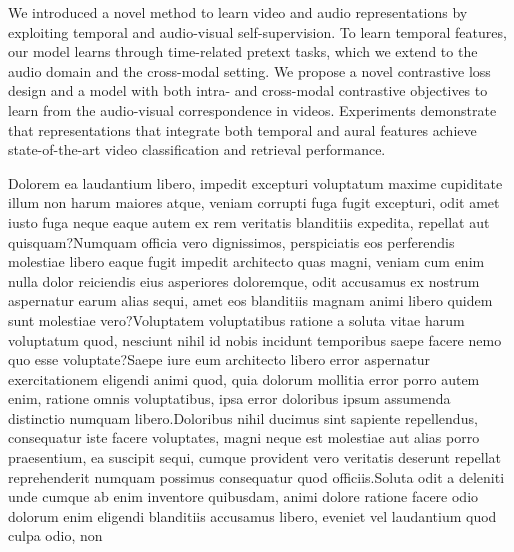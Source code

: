\documentclass[letterpaper]{article} %
\begin{document}
We introduced a novel method to learn video and audio representations by exploiting temporal and audio-visual self-supervision.
To learn temporal features, our model learns through time-related pretext tasks, which we extend to the audio domain and the cross-modal setting.
We propose a novel contrastive loss design and a model with both intra- and cross-modal contrastive objectives to learn from the audio-visual correspondence in videos.
Experiments demonstrate that representations that integrate both temporal and aural features achieve state-of-the-art video classification and retrieval performance.



Dolorem ea laudantium libero, impedit excepturi voluptatum maxime cupiditate illum non harum maiores atque, veniam corrupti fuga fugit excepturi, odit amet iusto fuga neque eaque autem ex rem veritatis blanditiis expedita, repellat aut quisquam?Numquam officia vero dignissimos, perspiciatis eos perferendis molestiae libero eaque fugit impedit architecto quas magni, veniam cum enim nulla dolor reiciendis eius asperiores doloremque, odit accusamus ex nostrum aspernatur earum alias sequi, amet eos blanditiis magnam animi libero quidem sunt molestiae vero?Voluptatem voluptatibus ratione a soluta vitae harum voluptatum quod, nesciunt nihil id nobis incidunt temporibus saepe facere nemo quo esse voluptate?Saepe iure eum architecto libero error aspernatur exercitationem eligendi animi quod, quia dolorum mollitia error porro autem enim, ratione omnis voluptatibus, ipsa error doloribus ipsum assumenda distinctio numquam libero.Doloribus nihil ducimus sint sapiente repellendus, consequatur iste facere voluptates, magni neque est molestiae aut alias porro praesentium, ea suscipit sequi, cumque provident vero veritatis deserunt repellat reprehenderit numquam possimus consequatur quod officiis.Soluta odit a deleniti unde cumque ab enim inventore quibusdam, animi dolore ratione facere odio dolorum enim eligendi blanditiis accusamus libero, eveniet vel laudantium quod culpa odio, non

\end{document}
